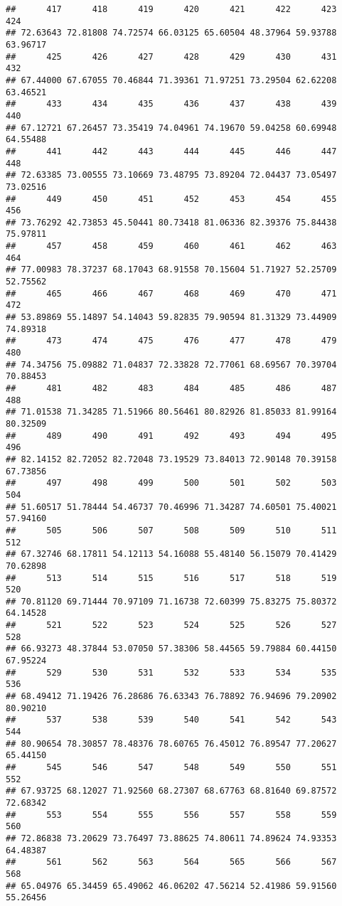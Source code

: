 \documentclass[
]{article}
\begin{document}
\begin{verbatim}
##      417      418      419      420      421      422      423      424 
## 72.63643 72.81808 74.72574 66.03125 65.60504 48.37964 59.93788 63.96717 
##      425      426      427      428      429      430      431      432 
## 67.44000 67.67055 70.46844 71.39361 71.97251 73.29504 62.62208 63.46521 
##      433      434      435      436      437      438      439      440 
## 67.12721 67.26457 73.35419 74.04961 74.19670 59.04258 60.69948 64.55488 
##      441      442      443      444      445      446      447      448 
## 72.63385 73.00555 73.10669 73.48795 73.89204 72.04437 73.05497 73.02516 
##      449      450      451      452      453      454      455      456 
## 73.76292 42.73853 45.50441 80.73418 81.06336 82.39376 75.84438 75.97811 
##      457      458      459      460      461      462      463      464 
## 77.00983 78.37237 68.17043 68.91558 70.15604 51.71927 52.25709 52.75562 
##      465      466      467      468      469      470      471      472 
## 53.89869 55.14897 54.14043 59.82835 79.90594 81.31329 73.44909 74.89318 
##      473      474      475      476      477      478      479      480 
## 74.34756 75.09882 71.04837 72.33828 72.77061 68.69567 70.39704 70.88453 
##      481      482      483      484      485      486      487      488 
## 71.01538 71.34285 71.51966 80.56461 80.82926 81.85033 81.99164 80.32509 
##      489      490      491      492      493      494      495      496 
## 82.14152 82.72052 82.72048 73.19529 73.84013 72.90148 70.39158 67.73856 
##      497      498      499      500      501      502      503      504 
## 51.60517 51.78444 54.46737 70.46996 71.34287 74.60501 75.40021 57.94160 
##      505      506      507      508      509      510      511      512 
## 67.32746 68.17811 54.12113 54.16088 55.48140 56.15079 70.41429 70.62898 
##      513      514      515      516      517      518      519      520 
## 70.81120 69.71444 70.97109 71.16738 72.60399 75.83275 75.80372 64.14528 
##      521      522      523      524      525      526      527      528 
## 66.93273 48.37844 53.07050 57.38306 58.44565 59.79884 60.44150 67.95224 
##      529      530      531      532      533      534      535      536 
## 68.49412 71.19426 76.28686 76.63343 76.78892 76.94696 79.20902 80.90210 
##      537      538      539      540      541      542      543      544 
## 80.90654 78.30857 78.48376 78.60765 76.45012 76.89547 77.20627 65.44150 
##      545      546      547      548      549      550      551      552 
## 67.93725 68.12027 71.92560 68.27307 68.67763 68.81640 69.87572 72.68342 
##      553      554      555      556      557      558      559      560 
## 72.86838 73.20629 73.76497 73.88625 74.80611 74.89624 74.93353 64.48387 
##      561      562      563      564      565      566      567      568 
## 65.04976 65.34459 65.49062 46.06202 47.56214 52.41986 59.91560 55.26456
\end{verbatim}
\end{document}
